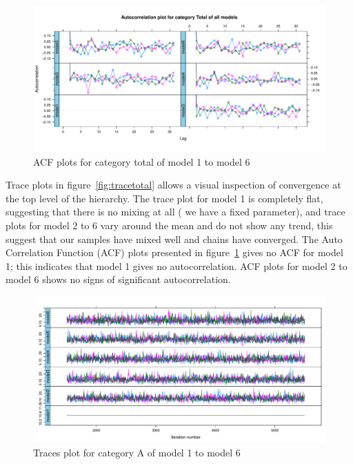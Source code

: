 \begin{figure}[!ht]
	\centering
	\includegraphics[width=1.0\linewidth]{../../R-codes/JAGS/plots/findmodel/Acftotal3abn.PDF}
	\caption{ACF plots for category total of model 1 to model 6}
	\label{fig:ACFtotal}
\end{figure}

Trace plots in figure~\ref{fig:tracetotal} allows a visual inspection of convergence at the top level of the hierarchy. The trace plot for model 1 is completely flat, suggesting that there is no mixing at all ( we have a fixed parameter), and trace plots for model 2 to 6 vary around the mean and do not show any trend, this suggest that our samples have mixed well and chains have converged. The Auto Correlation Function (ACF) plots presented in figure~\ref{fig:ACFtotal} gives no ACF for model 1; this indicates that model 1 gives no autocorrelation. ACF plots for model 2 to model 6 shows no signs of significant autocorrelation. 

\newpage %

\begin{figure}[!ht]
	\centering
	\includegraphics[width=1.0\linewidth]{../../R-codes/JAGS/plots/findmodel/TraceA3abn.PDF}
	\caption{Traces plot for category A of model 1 to model 6}
	\label{fig:traceA}
\end{figure}

